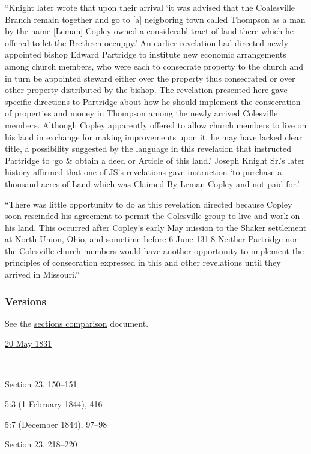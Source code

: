 			``Knight later wrote that upon their arrival `it was advised that the Coalesville Branch remain together and go to [a] neigboring town called Thompson as a man by the name [Leman] Copley owned a considerabl tract of land there which he offered to let the Brethren occuppy.' An earlier revelation had directed newly appointed bishop Edward Partridge to institute new economic arrangements among church members, who were each to consecrate property to the church and in turn be appointed steward either over the property thus consecrated or over other property distributed by the bishop. The revelation presented here gave specific directions to Partridge about how he should implement the consecration of properties and money in Thompson among the newly arrived Colesville members. Although Copley apparently offered to allow church members to live on his land in exchange for making improvements upon it, he may have lacked clear title, a possibility suggested by the language in this revelation that instructed Partridge to `go \& obtain a deed or Article of this land.' Joseph Knight Sr.'s later history affirmed that one of JS's revelations gave instruction `to purchase a thousand acres of Land which was Claimed By Leman Copley and not paid for.'
			
			``There was little opportunity to do as this revelation directed because Copley soon rescinded his agreement to permit the Colesville group to live and work on his land. This occurred after Copley's early May mission to the Shaker settlement at North Union, Ohio, and sometime before 6 June 131.8 Neither Partridge nor the Colesville church members would have another opportunity to implement the principles of consecration expressed in this and other revelations until they arrived in Missouri.''
		
	\subsubsection{Versions}
		\label{DC51-V}
		
		See the \href{https://drive.google.com/file/d/1goAvNz8jS4R8slYfMG_db55Ty2z_vmgK/view?usp=sharing}{sections comparison} document.
	
		\begin{compactdesc}
			\item[JSP] \hyperref[EMS-1831-JS-20-MAY-1831]{20 May 1831}
			\item[BC] ---
			\item[DC 1835] Section 23, 150--151
			\item[TS] 5:3 (1 February 1844), 416
			\item[MS] 5:7 (December 1844), 97--98
			\item[DC 1844] Section 23, 218--220
		\end{compactdesc}

